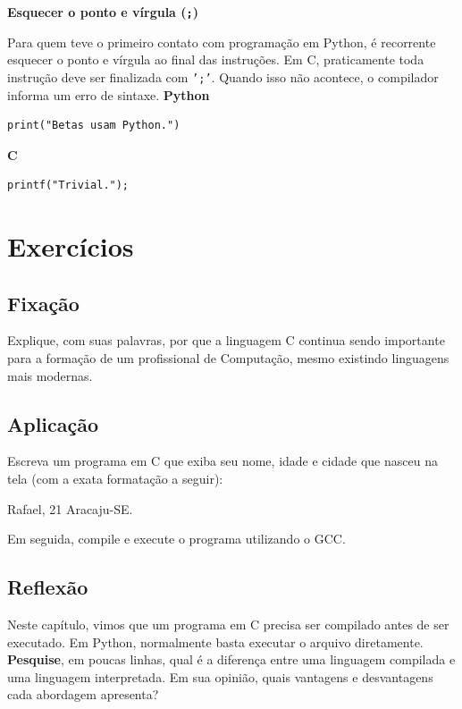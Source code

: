 \documentclass[12pt,a4paper,oneside]{extreport}
\begin{document}
\begin{errocomum}

\textbf{Esquecer o ponto e vírgula (\texttt{;})}

Para quem teve o primeiro contato com programação em Python, é recorrente esquecer o ponto e vírgula ao final das instruções. Em C, praticamente toda instrução deve ser finalizada com \texttt{';'}. Quando isso não acontece, o compilador informa um erro de sintaxe.
\newline
\newline \textbf{Python}

\begin{lstlisting}
print("Betas usam Python.")
\end{lstlisting}

\textbf{C}

\begin{lstlisting}
printf("Trivial.");
\end{lstlisting}

\end{errocomum}


\section*{Exercícios}

\begin{exercicio}

\subsection*{Fixação} 
Explique, com suas palavras, por que a linguagem C continua sendo importante para a formação de um profissional de Computação, mesmo existindo linguagens mais modernas. \newline

\subsection*{Aplicação} 
Escreva um programa em C que exiba seu nome, idade e cidade que nasceu na tela (com a exata formatação a seguir):

\begin{terminal}
Rafael, 21
Aracaju-SE.
\end{terminal}

Em seguida, compile e execute o programa utilizando o GCC.

\subsection*{Reflexão} 
Neste capítulo, vimos que um programa em C precisa ser compilado antes de ser executado. Em Python, normalmente basta executar o arquivo diretamente.
\textbf{Pesquise}, em poucas linhas, qual é a diferença entre uma linguagem compilada e uma linguagem interpretada. Em sua opinião, quais vantagens e desvantagens cada abordagem apresenta?
    
\end{exercicio}
\end{document}
